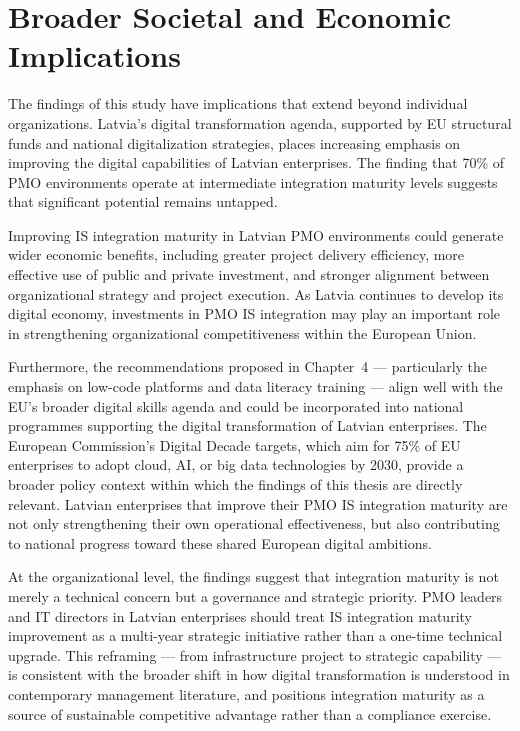 \section{Broader Societal and Economic Implications}
\label{sec:societal}

The findings of this study have implications that extend beyond
individual organizations. Latvia's digital transformation agenda,
supported by EU structural funds and national digitalization
strategies, places increasing emphasis on improving the digital
capabilities of Latvian enterprises. The finding that 70\% of PMO
environments operate at intermediate integration maturity levels
suggests that significant potential remains untapped.

Improving IS integration maturity in Latvian PMO environments could
generate wider economic benefits, including greater project delivery
efficiency, more effective use of public and private investment, and
stronger alignment between organizational strategy and project
execution. As Latvia continues to develop its digital economy,
investments in PMO IS integration may play an important role in
strengthening organizational competitiveness within the European
Union.

Furthermore, the recommendations proposed in Chapter~4 --- particularly
the emphasis on low-code platforms and data literacy training --- align
well with the EU's broader digital skills agenda and could be
incorporated into national programmes supporting the digital
transformation of Latvian enterprises. The European Commission's
Digital Decade targets, which aim for 75\% of EU enterprises to adopt
cloud, AI, or big data technologies by 2030, provide a broader policy
context within which the findings of this thesis are directly relevant.
Latvian enterprises that improve their PMO IS integration maturity are
not only strengthening their own operational effectiveness, but also
contributing to national progress toward these shared European digital
ambitions.

At the organizational level, the findings suggest that integration
maturity is not merely a technical concern but a governance and
strategic priority. PMO leaders and IT directors in Latvian enterprises
should treat IS integration maturity improvement as a multi-year
strategic initiative rather than a one-time technical upgrade. This
reframing --- from infrastructure project to strategic capability ---
is consistent with the broader shift in how digital transformation
is understood in contemporary management literature, and positions
integration maturity as a source of sustainable competitive advantage
rather than a compliance exercise.

